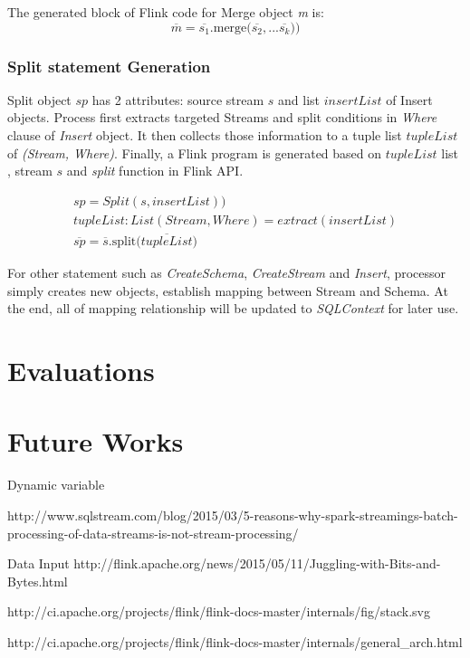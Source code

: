 The generated block of Flink code for Merge object \textit{m} is:
\begin{equation}
	\overline{m} = \overline{s_1}\textrm{.merge(}\overline{s_2}, ...\overline{s_k} \textrm{))}
\end{equation}

\subsubsection*{Split statement Generation}

Split object $sp$ has 2 attributes: source stream $s$ and list $insertList$ of Insert objects. Process first extracts targeted Streams and split conditions in \textit{Where} clause  of \textit{Insert} object. It then collects those information to a tuple list $tupleList$ of \textit{(Stream, Where)}. Finally, a Flink program is generated based on $tupleList$ list ,  stream $s$ and \textit{split} function in Flink API.

\begin{align}
	sp = Split(s, insertList)) \\
	tupleList: List(Stream, Where) = extract(insertList) \\
	\overline{sp} = \overline{s}\textrm{.split(}\overline{tupleList})
\end{align}

For other statement such as \textit{CreateSchema}, \textit{CreateStream} and \textit{Insert}, processor simply creates new objects, establish mapping between Stream and Schema. At the end, all of mapping relationship will be updated to \textit{SQLContext} for later use.

\section{Evaluations}



\section{Future Works}

Dynamic variable


http://www.sqlstream.com/blog/2015/03/5-reasons-why-spark-streamings-batch-processing-of-data-streams-is-not-stream-processing/



Data Input
http://flink.apache.org/news/2015/05/11/Juggling-with-Bits-and-Bytes.html


http://ci.apache.org/projects/flink/flink-docs-master/internals/fig/stack.svg

http://ci.apache.org/projects/flink/flink-docs-master/internals/general\_arch.html